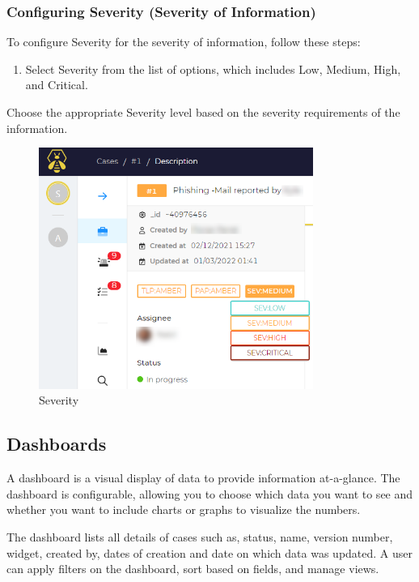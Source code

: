 \documentclass{article}
\begin{document}
\subsubsection*{Configuring Severity (Severity of Information)}

To configure Severity for the severity of information, follow these steps:

\begin{enumerate}
  \item Select Severity from the list of options, which includes Low, Medium, High, and Critical.
\end{enumerate}

Choose the appropriate Severity level based on the severity requirements of the information.

\begin{figure}[H]
    \centering
    \includegraphics[width=0.8\textwidth]{configure3.png}
    \caption{Severity}
    \label{fig:severity}

\end{figure}

\subsection{Dashboards}
\begin{compactitem}
    \item A dashboard is a visual display of data to provide information at-a-glance. The dashboard is configurable, allowing you to choose which data you want to see and whether you want to include charts or graphs to visualize the numbers.
    \item The dashboard lists all details of cases such as, status, name, version number, widget, created by, dates of creation and date on which data was updated. A user can apply filters on the dashboard, sort based on fields, and manage views.
\end{compactitem}
\end{document}

